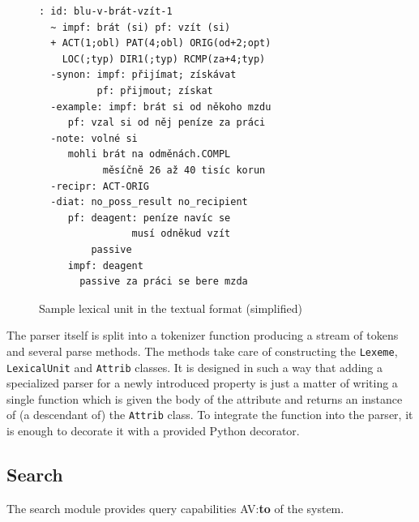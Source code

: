 \documentclass[10pt, a4paper]{article}
\newcommand{\py}[1]{{\tt #1}}
\newcommand{\avout}[2][]{{\color{ansa} AV:}{\color{lightgray}\textbf{#2}} {\color{ansa} #1}}
\begin{document}
\begin{figure}
\small
\begin{verbatim}
: id: blu-v-brát-vzít-1
  ~ impf: brát (si) pf: vzít (si)
  + ACT(1;obl) PAT(4;obl) ORIG(od+2;opt)
    LOC(;typ) DIR1(;typ) RCMP(za+4;typ)
  -synon: impf: přijímat; získávat
          pf: přijmout; získat
  -example: impf: brát si od někoho mzdu
     pf: vzal si od něj peníze za práci
  -note: volné si
     mohli brát na odměnách.COMPL
           měsíčně 26 až 40 tisíc korun
  -recipr: ACT-ORIG
  -diat: no_poss_result no_recipient
     pf: deagent: peníze navíc se
                musí odněkud vzít
         passive
     impf: deagent
       passive za práci se bere mzda
\end{verbatim}
\caption{\label{fig:txt-fmt}Sample lexical unit in the textual format (simplified)}
\end{figure}

The parser itself is split into a tokenizer function producing a stream of tokens and several
parse methods. The methods take care of constructing the \py{Lexeme}, \py{LexicalUnit}
and \py{Attrib} classes. It is designed in such a way that adding a specialized parser for
a newly introduced property is just a matter of writing a single function which is given
the body of the attribute and returns an instance of (a descendant of) the \py{Attrib} class.
To integrate the function into the parser, it is enough to decorate it with a provided
Python decorator.

\subsection{Search}
The search module provides query capabilities \avout[of]{to} the system.
\end{document}
